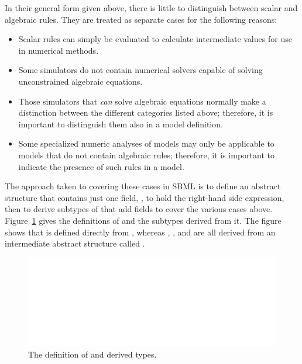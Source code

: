 \documentclass[10pt]{cekarticle}
\newcommand{\vref}[1]{\ref{#1}}
\newenvironment{blockChanged}{\color{BrickRed}}{}
\begin{document}
\begin{blockChanged}
In their general form given above, there is little to distinguish between
scalar and algebraic rules.  They are treated as separate cases for the
following reasons:
\begin{itemize}
  
\item Scalar rules can simply be evaluated to calculate intermediate
  values for use in numerical methods.
  
\item Some simulators do not contain numerical solvers capable of solving
  unconstrained algebraic equations.
  
\item Those simulators that \emph{can} solve algebraic equations normally
  make a distinction between the different categories listed above;
  therefore, it is important to distinguish them also in a model
  definition.
  
\item Some specialized numeric analyses of models may only be applicable to
  models that do not contain algebraic rules; therefore, it is important to
  indicate the presence of such rules in a model.
\end{itemize}
\end{blockChanged}

The approach taken to covering these cases in SBML is to define an abstract
 structure that contains just one field, , to
hold the right-hand side expression, then to derive subtypes of
 that add fields to cover the various cases above.
Figure~\vref{fig:rules} gives the definitions of  and the
subtypes derived from it.  The figure shows that  is
defined directly from , whereas ,
, and  are all derived
from an intermediate abstract structure called .

\begin{figure}[htb]
  \centering
  \vspace*{-3pt}
  \includegraphics[scale = 0.65]{rule}
  \vspace*{-3pt}
  \caption{The definition of  and derived types.}
  \label{fig:rules}
\end{figure}
\end{document}
